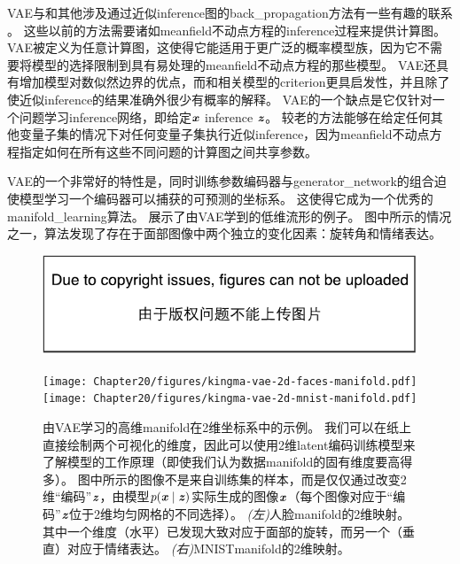 \gls{VAE}与和其他涉及通过近似\gls{inference}图的\gls{back_propagation}方法有一些有趣的联系 \citep{Goodfellow-et-al-NIPS2013,Stoyanov2011,brakel13a}。
这些以前的方法需要诸如\gls{meanfield}不动点方程的\gls{inference}过程来提供计算图。
\gls{VAE}被定义为任意计算图，这使得它能适用于更广泛的概率模型族，因为它不需要将模型的选择限制到具有易处理的\gls{meanfield}不动点方程的那些模型。
\gls{VAE}还具有增加模型对数似然边界的优点，而和相关模型的\gls{criterion}更具启发性，并且除了使近似\gls{inference}的结果准确外很少有概率的解释。
\gls{VAE}的一个缺点是它仅针对一个问题学习\gls{inference}网络，即给定$\boldsymbol{\mathit{x}}$ \gls{inference} $\boldsymbol{\mathit{z}}$。
较老的方法能够在给定任何其他变量子集的情况下对任何变量子集执行近似\gls{inference}，因为\gls{meanfield}不动点方程指定如何在所有这些不同问题的计算图之间共享参数。


\gls{VAE}的一个非常好的特性是，同时训练参数编码器与\gls{generator_network}的组合迫使模型学习一个编码器可以捕获的可预测的坐标系。
这使得它成为一个优秀的\gls{manifold_learning}算法。
展示了由\gls{VAE}学到的低维流形的例子。
图中所示的情况之一，算法发现了存在于面部图像中两个独立的变化因素：旋转角和情绪表达。


\begin{figure}[!htb]
\ifOpenSource
\centerline{\includegraphics{figure.pdf}}
\else
\centerline{
\texttt{[image: Chapter20/figures/kingma-vae-2d-faces-manifold.pdf]}
\texttt{[image: Chapter20/figures/kingma-vae-2d-mnist-manifold.pdf]}
}
\fi
\caption{由\gls{VAE}学习的高维\gls{manifold}在2维坐标系中的示例\citep{Kingma+Welling-ICLR2014}。
我们可以在纸上直接绘制两个可视化的维度，因此可以使用2维\gls{latent}编码训练模型来了解模型的工作原理（即使我们认为数据\gls{manifold}的固有维度要高得多）。
图中所示的图像不是来自训练集的样本，而是仅仅通过改变2维``编码''$\boldsymbol{\mathit{z}}$，由模型$p(\boldsymbol{\mathit{x}} \mid \boldsymbol{\mathit{z}})$实际生成的图像$\boldsymbol{\mathit{x}}$（每个图像对应于``编码''$\boldsymbol{\mathit{z}}$位于2维均匀网格的不同选择）。
\emph{(左)}人脸\gls{manifold}的2维映射。 其中一个维度（水平）已发现大致对应于面部的旋转，而另一个（垂直）对应于情绪表达。
\emph{(右)}MNIST\gls{manifold}的2维映射。
}
\label{fig:chap20_kingma-vae-2d-faces-manifold}
\end{figure}

